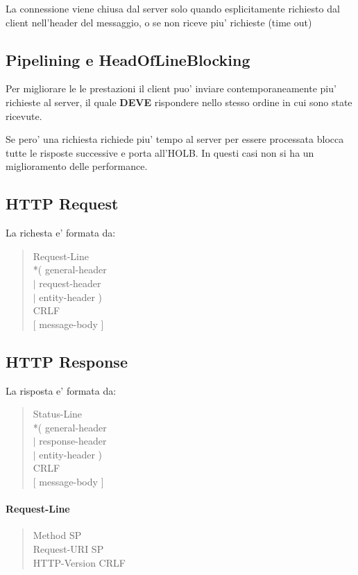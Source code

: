La connessione viene chiusa dal server solo quando esplicitamente richiesto dal client nell'header del messaggio, o se non riceve piu' richieste (time out)

\subsection{Pipelining e HeadOfLineBlocking}

Per migliorare le le prestazioni il client puo' inviare contemporaneamente piu' richieste al server, il quale \textbf{DEVE} rispondere nello stesso ordine in cui sono state ricevute.

Se pero' una richiesta richiede piu' tempo al server per essere processata blocca tutte le risposte successive e porta all'HOLB. In questi casi non si ha un miglioramento delle performance.

\newpage
\subsection{HTTP Request}

La richesta e' formata da:
\begin{quote}
    Request-Line \\
    *( general-header \\
    $\vert$ request-header \\
    $\vert$ entity-header ) \\
    CRLF \\
    $[$ message-body $]$
\end{quote}

\subsection{HTTP Response}

La risposta e' formata da:
\begin{quote}
    Status-Line \\
    *( general-header \\
    $\vert$ response-header \\
    $\vert$ entity-header ) \\
    CRLF \\
    $[$ message-body $]$
\end{quote}

\paragraph{Request-Line}
\begin{quote}
    Method SP \\
    Request-URI SP \\
    HTTP-Version CRLF
\end{quote}
